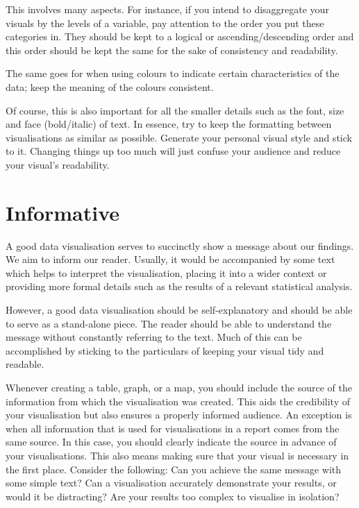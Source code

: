 \documentclass[
]{book}
\begin{document}
This involves many aspects. For instance, if you intend to disaggregate your visuals by the levels of a variable, pay attention to the order you put these categories in. They should be kept to a logical or ascending/descending order and this order should be kept the same for the sake of consistency and readability.

The same goes for when using colours to indicate certain characteristics of the data; keep the meaning of the colours consistent.

Of course, this is also important for all the smaller details such as the font, size and face (bold/italic) of text. In essence, try to keep the formatting between visualisations as similar as possible. Generate your personal visual style and stick to it. Changing things up too much will just confuse your audience and reduce your visual's readability.

\hypertarget{informative}{%
\section{Informative}\label{informative}}

A good data visualisation serves to succinctly show a message about our findings. We aim to inform our reader. Usually, it would be accompanied by some text which helps to interpret the visualisation, placing it into a wider context or providing more formal details such as the results of a relevant statistical analysis.

However, a good data visualisation should be self-explanatory and should be able to serve as a stand-alone piece. The reader should be able to understand the message without constantly referring to the text. Much of this can be accomplished by sticking to the particulars of keeping your visual tidy and readable.

Whenever creating a table, graph, or a map, you should include the source of the information from which the visualisation was created. This aids the credibility of your visualisation but also ensures a properly informed audience. An exception is when all information that is used for visualisations in a report comes from the same source. In this case, you should clearly indicate the source in advance of your visualisations.
This also means making sure that your visual is necessary in the first place. Consider the following: Can you achieve the same message with some simple text? Can a visualisation accurately demonstrate your results, or would it be distracting? Are your results too complex to visualise in isolation?
\end{document}
